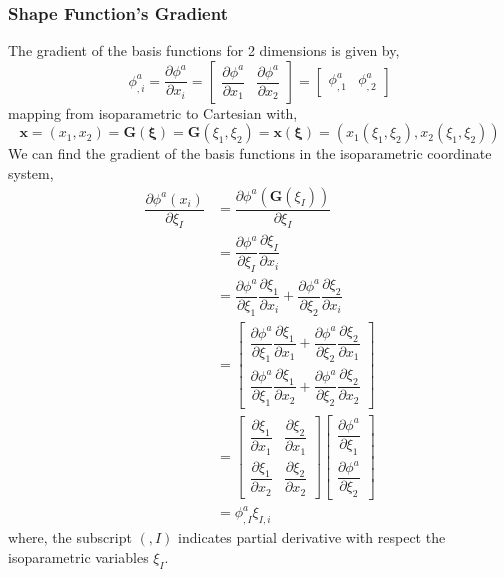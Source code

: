 \documentclass[11pt, a4paper]{article}
\numberwithin{equation}{section}
\begin{document}
\subsubsection{Shape Function's Gradient}

The gradient of the basis functions for 2 dimensions is given by,
\begin{equation*}
\phi^a_{,i} =  \dfrac{\partial \phi^a}{\partial x_i} = 
\begin{bmatrix}
\dfrac{\partial \phi^a}{\partial x_1}  & \dfrac{\partial \phi^a}{\partial x_2} 
\end{bmatrix}=
\begin{bmatrix}
\phi^a_{,1} & \phi^a_{,2}
\end{bmatrix} 
\end{equation*}
mapping from isoparametric to Cartesian with,
\begin{equation*}
\mathbf{x} = ( x_1, x_2) = \mathbf{G}(\boldsymbol \xi) = \mathbf{G} (\xi_1, \xi_2) = \mathbf{x}(\boldsymbol \xi) = (x_1(\xi_1,\xi_2), x_2(\xi_1,\xi_2))
\end{equation*}
We can find the gradient of the basis functions in the isoparametric coordinate system,
\begin{align*}
\dfrac{\partial \phi^a(x_i)}{\partial \xi_I} &=\dfrac{\partial \phi^a( \mathbf{G}( \xi_I))}{\partial \xi_I}  \\
&= \dfrac{\partial \phi^a}{\partial \xi_I}
\dfrac{\partial \xi_I}{\partial x_i} \\
& = \dfrac{\partial \phi^a}{\partial \xi_1}
\dfrac{\partial \xi_1}{\partial x_i} +
\dfrac{\partial \phi^a}{\partial \xi_2}
\dfrac{\partial \xi_2}{\partial x_i} \\
&= \begin{bmatrix}
\dfrac{\partial \phi^a}{\partial \xi_1}
\dfrac{\partial \xi_1}{\partial x_1} +
\dfrac{\partial \phi^a}{\partial \xi_2}
\dfrac{\partial \xi_2}{\partial x_1} \\[0.4cm]
\dfrac{\partial \phi^a}{\partial \xi_1}
\dfrac{\partial \xi_1}{\partial x_2} +
\dfrac{\partial \phi^a}{\partial \xi_2}
\dfrac{\partial \xi_2}{\partial x_2} 
\end{bmatrix} \\
&= 
\begin{bmatrix}
\dfrac{\partial \xi_1}{\partial x_1} & \dfrac{\partial \xi_2}{\partial x_1}\\[0.4cm]
\dfrac{\partial \xi_1}{\partial x_2} & \dfrac{\partial \xi_2}{\partial x_2}
\end{bmatrix}
\begin{bmatrix}
\dfrac{\partial \phi^a}{\partial \xi_1} \\[0.4cm] \dfrac{\partial \phi^a}{\partial \xi_2}
\end{bmatrix} \\
&= \phi^a_{,I} \xi_{I,i}
\end{align*}
where, the subscript $(,I)$ indicates partial derivative with respect the isoparametric variables $\xi_I$. 
\end{document}
